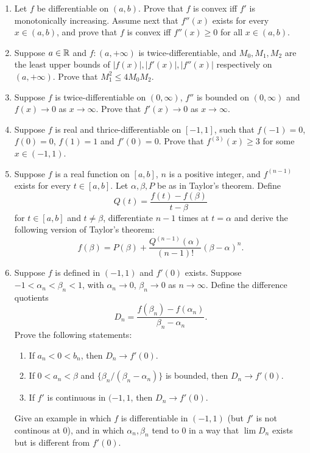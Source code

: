 \begin{enumerate}[1.]
\item %
    Let $f$ be differentiable on $(a, b)$. Prove that $f$ is convex iff $f'$ is monotonically increasing. Assume next that $f''(x)$ exists for every $x \in (a, b)$, and prove that $f$ is convex iff $f''(x) \ge 0$ for all $x \in (a, b)$.
\item %
    Suppose $a \in \mathbb{R}$ and $f: (a, +\infty)$ is twice-differentiable, and $M_0, M_1, M_2$ are the least upper bounds of $|f(x)|, |f'(x)|, |f''(x)|$ respectively on $(a, +\infty)$. Prove that $M_1^2 \le 4M_0M_2$.
\item %
    Suppose $f$ is twice-differentiable on $(0, \infty)$, $f''$ is bounded on $(0, \infty)$ and $f(x) \to 0$ as $x \to \infty$. Prove that $f'(x) \to 0$ as $x \to \infty$.
\item %
    Suppose $f$ is real and thrice-differentiable on $[-1, 1]$, such that $f(-1) = 0$, $f(0) = 0$, $f(1) = 1$ and $f'(0) = 0$. Prove that $f^{(3)}(x) \ge 3$ for some $x \in (-1, 1)$.
\item %
    Suppose $f$ is a real function on $[a, b]$, $n$ is a positive integer, and $f^{(n-1)}$ exists for every $t \in [a, b]$. Let $\alpha, \beta, P$ be as in Taylor's theorem. Define
    \[
        Q(t) = \frac{f(t) - f(\beta)}{t - \beta}
    \]
    for $t \in [a, b]$ and $t \ne \beta$, differentiate $n - 1$ times at $t = \alpha$ and derive the following version of Taylor's theorem:
    \[
        f(\beta) = P(\beta) + \frac{Q^{(n-1)}(\alpha)}{(n-1)!} (\beta - \alpha)^n.
    \]
\item %
    Suppose $f$ is defined in $(-1, 1)$ and $f'(0)$ exists. Suppose $-1 < \alpha_n < \beta_n < 1$, with $\alpha_n \to 0$, $\beta_n \to 0$ as $n \to \infty$. Define the difference quotients
    \[
        D_n = \frac{f(\beta_n) - f(\alpha_n)}{\beta_n - \alpha_n}.
    \]
    Prove the following statements:
    \begin{enumerate}
    \item If $a_n < 0 < b_n$, then $D_n \to f'(0)$.
    \item If $0 < a_n < \beta$ and $\{\beta_n/(\beta_n - \alpha_n)\}$ is bounded, then $D_n \to f'(0)$.
    \item If $f'$ is continuous in $(-1, 1$, then $D_n \to f'(0)$.
    \end{enumerate}
    Give an example in which $f$ is differentiable in $(-1, 1)$ (but $f'$ is not continous at $0$), and in which $\alpha_n, \beta_n$ tend to $0$ in a way that $\lim D_n$ exists but is different from $f'(0)$.

\end{enumerate}
